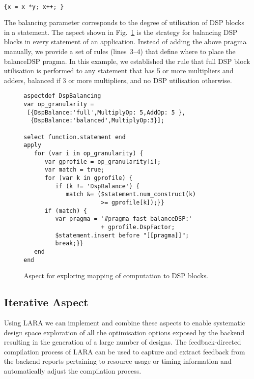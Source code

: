 \noindent\texttt{\footnotesize{} \\
\{x = x *y; x++; \}}

\vspace{2mm} The balancing parameter corresponds to the degree of
utilisation of DSP blocks in a statement.  The aspect shown in
Fig.~\ref{fig:aspect-DSP} is the strategy for balancing DSP blocks in
every statement of an application. Instead of adding the above pragma
manually, we provide a set of rules (lines~3--4) that define where to
place the balanceDSP pragma. In this example, we established the rule
that full DSP block utilisation is performed to any statement that has
5 or more multipliers and adders, balanced if 3 or more multipliers,
and no DSP utilisation otherwise.

\lstset{style=lara}
\begin{figure}[!h]
  \centering
  \begin{lstlisting}
aspectdef DspBalancing
var op_granularity =
 [{DspBalance:'full',MultiplyOp: 5,AddOp: 5 },
  {DspBalance:'balanced',MultiplyOp:3}];

select function.statement end
apply
   for (var i in op_granularity) {
      var gprofile = op_granularity[i];
      var match = true;
      for (var k in gprofile) {
         if (k != 'DspBalance') {
            match &= ($statement.num_construct(k)
                      >= gprofile[k]);}}
      if (match) {
         var pragma = '#pragma fast balanceDSP:'
                      + gprofile.DspFactor;
         $statement.insert before "[[pragma]]";
         break;}}
   end
end
  \end{lstlisting}
  \caption{Aspect for exploring mapping of computation to DSP blocks.}
  \label{fig:aspect-DSP}
\vspace{-3mm}
\end{figure}

\subsection{Iterative Aspect}
\label{sect:asp_it}
Using LARA we can implement and combine these aspects to enable
systematic design space exploration of all the optimisation options
exposed by the \MAXC{} backend resulting in the generation of a large
number of designs. The feedback-directed compilation process of LARA
can be used to capture and extract feedback from the backend reports
pertaining to resource usage or timing information and automatically
adjust the compilation process.

